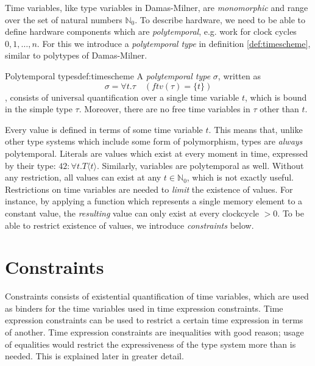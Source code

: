 Time variables, like type variables in Damas-Milner, are \textit{monomorphic} and range over the set of natural numbers $\mathbb{N}_0$.
To describe hardware, we need to be able to define hardware components which are \textit{polytemporal}, e.g. work for clock cycles $0,1,\ldots,n$.
For this we introduce a \textit{polytemporal type} in definition \ref{def:timescheme}, similar to polytypes of Damas-Milner.

\begin{definitiontitled}{Polytemporal types}{def:timescheme}
A \textit{polytemporal type} $\sigma$, written as 
\[ \sigma = \forall t.\tau \quad (\textit{ftv}(\tau) = \{t\})\]
, consists of universal quantification over a single time variable $t$, which is bound in the simple type $\tau$.
Moreover, there are no free time variables in $\tau$ other than $t$.
\end{definitiontitled}

Every value is defined in terms of some time variable $t$.
This means that, unlike other type systems which include some form of polymorphism, types are \textit{always} polytemporal.
Literals are values which exist at every moment in time, expressed by their type: $42 : \forall t. T\langle t \rangle$.
Similarly, variables are polytemporal as well.
Without any restriction, all values can exist at any $t \in \mathbb{N}_0$, which is not exactly useful.
Restrictions on time variables are needed to \textit{limit} the existence of values.
For instance, by applying a function which represents a single memory element to a constant value, the \textit{resulting} value can only exist at every clockcycle $> 0$. 
To be able to restrict existence of values, we introduce \textit{constraints} below.

\section{Constraints}
Constraints consists of existential quantification of time variables, which are used as binders for the time variables used in time expression constraints.
Time expression constraints can be used to restrict a certain time expression in terms of another.
Time expression constraints are inequalities with good reason; usage of equalities would restrict the expressiveness of the type system more than is needed.
This is explained later in greater detail.

